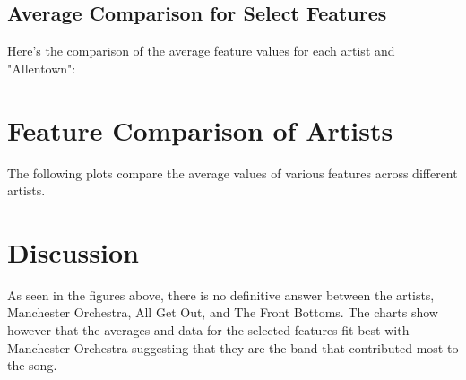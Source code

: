 \documentclass{article}\usepackage[]{graphicx}\usepackage[]{xcolor}
\makeatletter
\newenvironment{kframe}{%
 \def\at@end@of@kframe{}%
 \ifinner\ifhmode%
  \def\at@end@of@kframe{\end{minipage}}%
  \begin{minipage}{\columnwidth}%
 \fi\fi%
 \def\FrameCommand##1{\hskip\@totalleftmargin \hskip-\fboxsep
 \colorbox{shadecolor}{##1}\hskip-\fboxsep
     \hskip-\linewidth \hskip-\@totalleftmargin \hskip\columnwidth}%
 \MakeFramed {\advance\hsize-\width
   \@totalleftmargin\z@ \linewidth\hsize
   \@setminipage}}%
 {\par\unskip\endMakeFramed%
 \at@end@of@kframe}
\newenvironment{knitrout}{}{} %
\makeatother
\begin{document}
  \newpage  %

\subsection{Average Comparison for Select Features}
Here’s the comparison of the average feature values for each artist and "Allentown":

\section{Feature Comparison of Artists}

The following plots compare the average values of various features across different artists.

\begin{knitrout}
\color{fgcolor}\begin{kframe}


{\ttfamily\noindent\bfseries\color{errorcolor}{\#\# Error: object 'features\_to\_compare' not found}}

{\ttfamily\noindent\bfseries\color{errorcolor}{\#\# Error: object 'feature\_plots' not found}}

{\ttfamily\noindent\bfseries\color{errorcolor}{\#\# Error: object 'final\_avg\_plot' not found}}\end{kframe}
\end{knitrout}

\section{Discussion}
As seen in the figures above, there is no definitive answer between the artists, Manchester Orchestra, All Get Out, and The Front Bottoms. The charts show however that the averages and data for the selected features fit best with Manchester Orchestra suggesting that they are the band that contributed most to the song. 

\begin{tiny}

\end{tiny}
\end{document}
